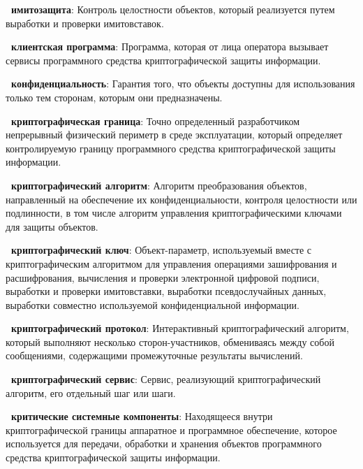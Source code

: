 {\bf \thedefctr~имитозащита}:
Контроль целостности объектов, 
который реализуется путем выработки и проверки имитовставок.



{\bf \thedefctr~клиентская программа}:
Программа, которая от лица оператора вызывает сервисы
программного средства криптографической защиты информации.

{\bf \thedefctr~конфиденциальность}:
Гарантия того, что объекты доступны для использования
только тем сторонам, которым они предназначены.

{\bf \thedefctr~криптографическая граница}: 
Точно определенный разработчиком непрерывный физический 
периметр в среде эксплуатации, 
который определяет контролируемую границу программного средства 
криптографической защиты информации.

{\bf \thedefctr~криптографический алгоритм}:
Алгоритм преобразования объектов,
направленный на обеспечение их конфиденциальности,
контроля целостности или подлинности,
в том числе алгоритм управления криптографическими
ключами для защиты объектов.


{\bf \thedefctr~криптографический ключ}: 
Объект-параметр, используемый вместе с криптографическим алгоритмом 
для управления операциями зашифрования и расшифрования,
вычисления и проверки электронной цифровой подписи,
выработки и проверки имитовставки,
выработки псевдослучайных данных,
выработки совместно используемой конфиденциальной информации.


{\bf \thedefctr~криптографический протокол}:
Интерактивный криптографический алгоритм, который выполняют 
несколько сторон-участников, обмениваясь между собой сообщениями, 
содержащими промежуточные результаты вычислений.

{\bf \thedefctr~криптографический сервис}:
Сервис, реализующий криптографический алгоритм, его отдельный шаг или 
шаги. 

{\bf \thedefctr~критические системные компоненты}:
Находящееся внутри криптографической границы 
аппаратное и программное обеспечение, которое используется
для передачи, обработки и хранения объектов
программного средства криптографической защиты информации.


